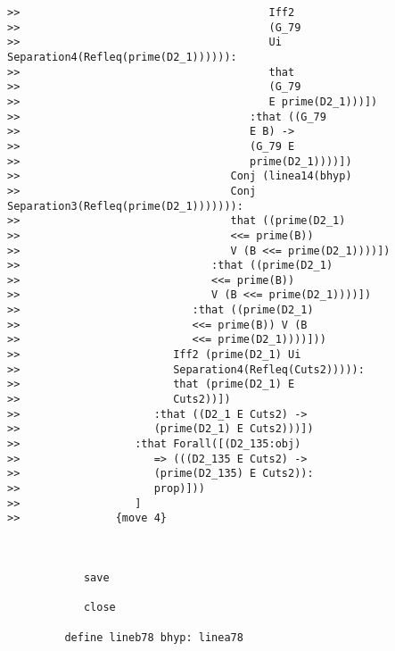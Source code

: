 \documentclass[12pt]{article}
\begin{document}
\begin{verbatim}
>>                                       Iff2
>>                                       (G_79
>>                                       Ui Separation4(Refleq(prime(D2_1)))))):
>>                                       that
>>                                       (G_79
>>                                       E prime(D2_1)))])
>>                                    :that ((G_79
>>                                    E B) ->
>>                                    (G_79 E
>>                                    prime(D2_1))))])
>>                                 Conj (linea14(bhyp)
>>                                 Conj Separation3(Refleq(prime(D2_1))))))):
>>                                 that ((prime(D2_1)
>>                                 <<= prime(B))
>>                                 V (B <<= prime(D2_1))))])
>>                              :that ((prime(D2_1)
>>                              <<= prime(B))
>>                              V (B <<= prime(D2_1))))])
>>                           :that ((prime(D2_1)
>>                           <<= prime(B)) V (B
>>                           <<= prime(D2_1))))]))
>>                        Iff2 (prime(D2_1) Ui
>>                        Separation4(Refleq(Cuts2))))):
>>                        that (prime(D2_1) E
>>                        Cuts2))])
>>                     :that ((D2_1 E Cuts2) ->
>>                     (prime(D2_1) E Cuts2)))])
>>                  :that Forall([(D2_135:obj)
>>                     => (((D2_135 E Cuts2) ->
>>                     (prime(D2_135) E Cuts2)):
>>                     prop)]))
>>                  ]
>>               {move 4}



            save

            close

         define lineb78 bhyp: linea78


\end{verbatim}
\end{document}
